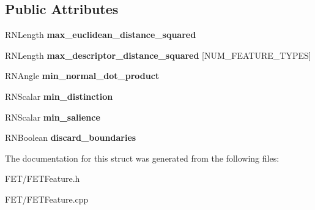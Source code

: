 \subsection*{Public Attributes}
\begin{DoxyCompactItemize}
\item 
R\+N\+Length {\bfseries max\+\_\+euclidean\+\_\+distance\+\_\+squared}\hypertarget{struct_f_e_t_compatibility_parameters_a5ab3174ed9af6eeb8a042ae55779fb2f}{}\label{struct_f_e_t_compatibility_parameters_a5ab3174ed9af6eeb8a042ae55779fb2f}

\item 
R\+N\+Length {\bfseries max\+\_\+descriptor\+\_\+distance\+\_\+squared} \mbox{[}N\+U\+M\+\_\+\+F\+E\+A\+T\+U\+R\+E\+\_\+\+T\+Y\+P\+ES\mbox{]}\hypertarget{struct_f_e_t_compatibility_parameters_aebb6850f7965d97f1c4671c43b8004ba}{}\label{struct_f_e_t_compatibility_parameters_aebb6850f7965d97f1c4671c43b8004ba}

\item 
R\+N\+Angle {\bfseries min\+\_\+normal\+\_\+dot\+\_\+product}\hypertarget{struct_f_e_t_compatibility_parameters_a3f3b3edc271d5129b4472cbe2263f112}{}\label{struct_f_e_t_compatibility_parameters_a3f3b3edc271d5129b4472cbe2263f112}

\item 
R\+N\+Scalar {\bfseries min\+\_\+distinction}\hypertarget{struct_f_e_t_compatibility_parameters_a8d43b72add4bc588a5c14e1fc0b8cfd1}{}\label{struct_f_e_t_compatibility_parameters_a8d43b72add4bc588a5c14e1fc0b8cfd1}

\item 
R\+N\+Scalar {\bfseries min\+\_\+salience}\hypertarget{struct_f_e_t_compatibility_parameters_ab81de0b4551cc8dba24cb85e4231efac}{}\label{struct_f_e_t_compatibility_parameters_ab81de0b4551cc8dba24cb85e4231efac}

\item 
R\+N\+Boolean {\bfseries discard\+\_\+boundaries}\hypertarget{struct_f_e_t_compatibility_parameters_a5daa946b3a24db2993590378f9186622}{}\label{struct_f_e_t_compatibility_parameters_a5daa946b3a24db2993590378f9186622}

\end{DoxyCompactItemize}


The documentation for this struct was generated from the following files\+:\begin{DoxyCompactItemize}
\item 
F\+E\+T/F\+E\+T\+Feature.\+h\item 
F\+E\+T/F\+E\+T\+Feature.\+cpp\end{DoxyCompactItemize}
